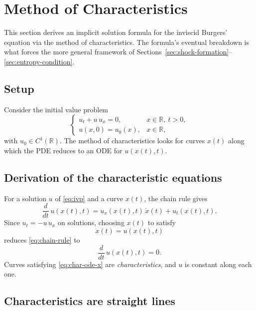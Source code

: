 \section{Method of Characteristics}
\label{sec:characteristics}

This section derives an implicit solution formula for the inviscid
Burgers' equation via the method of characteristics. The formula's
eventual breakdown is what forces the more general framework of
Sections~\ref{sec:shock-formation}--\ref{sec:entropy-condition}.

\subsection{Setup}
\label{subsec:char-setup}

Consider the initial value problem
\begin{equation}
  \label{eq:ivp}
  \begin{cases}
    u_t + u\, u_x = 0, & x \in \mathbb{R},\ t > 0, \\
    u(x,0) = u_0(x), & x \in \mathbb{R},
  \end{cases}
\end{equation}
with $u_0 \in C^1(\mathbb{R})$. The method of characteristics looks for
curves $x(t)$ along which the PDE reduces to an ODE for $u(x(t),t)$.

\subsection{Derivation of the characteristic equations}
\label{subsec:char-derivation}

For a solution $u$ of \eqref{eq:ivp} and a curve $x(t)$, the chain rule
gives
\begin{equation}
  \label{eq:chain-rule}
  \frac{d}{dt}\, u(x(t), t) = u_x(x(t),t)\, \dot{x}(t) + u_t(x(t),t).
\end{equation}
Since $u_t = -u\,u_x$ on solutions, choosing $x(t)$ to satisfy
\begin{equation}
  \label{eq:char-ode-x}
  \dot{x}(t) = u(x(t), t)
\end{equation}
reduces \eqref{eq:chain-rule} to
\begin{equation}
  \label{eq:char-ode-u}
  \frac{d}{dt}\, u(x(t), t) = 0.
\end{equation}
Curves satisfying \eqref{eq:char-ode-x} are \emph{characteristics}, and
$u$ is constant along each one.

\subsection{Characteristics are straight lines}
\label{subsec:char-lines}

